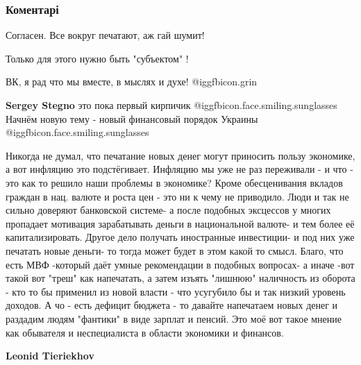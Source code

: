  
 
 
 
 
\subsubsection{Коментарі}

\begin{itemize} %
Согласен. Все вокруг печатают, аж гай шумит!

Только для этого нужно быть "субъектом" !

ВК, я рад что мы вместе, в мыслях и духе!  @igg{fbicon.grin} 

\begin{itemize} %
\textbf{Sergey Stegno} это пока первый кирпичик @igg{fbicon.face.smiling.sunglasses}  Начнём новую тему - новый финансовый порядок Украины @igg{fbicon.face.smiling.sunglasses} 


Никогда не думал, что печатание новых денег могут приносить пользу экономике, а
вот инфляцию это подстёгивает. Инфляцию мы уже не раз переживали - и что - это
как то решило наши проблемы в экономике? Кроме обесценивания вкладов граждан в
нац. валюте и роста цен - это ни к чему не приводило. Люди и так не сильно
доверяют банковской системе- а после подобных эксцессов у многих пропадает
мотивация зарабатывать деньги в национальной валюте- и тем более её
капитализировать. Другое дело получать иностранные инвестиции- и под них уже
печатать новые деньги- то тогда может будет в этом какой то смысл. Благо, что
есть МВФ -который даёт умные рекомендации в подобных вопросах- а иначе -вот
такой вот "треш" как напечатать, а затем изъять "лишнюю" наличность из оборота
- кто то бы применил из новой власти - что усугубило бы и так низкий уровень
доходов. А чо - есть дефицит бюджета - то давайте напечатаем новых денег и
раздадим людям "фантики" в виде зарплат и пенсий. Это моё вот такое мнение как
обывателя и неспециалиста в области экономики и финансов.

\textbf{Leonid Tieriekhov} 


\end{itemize}
\end{itemize}
